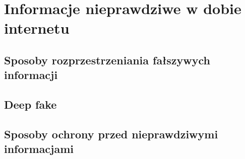 \chapter{Informacje nieprawdziwe w dobie internetu}
\section{Sposoby rozprzestrzeniania fałszywych informacji}
\section{Deep fake}
\section{Sposoby ochrony przed nieprawdziwymi informacjami}
